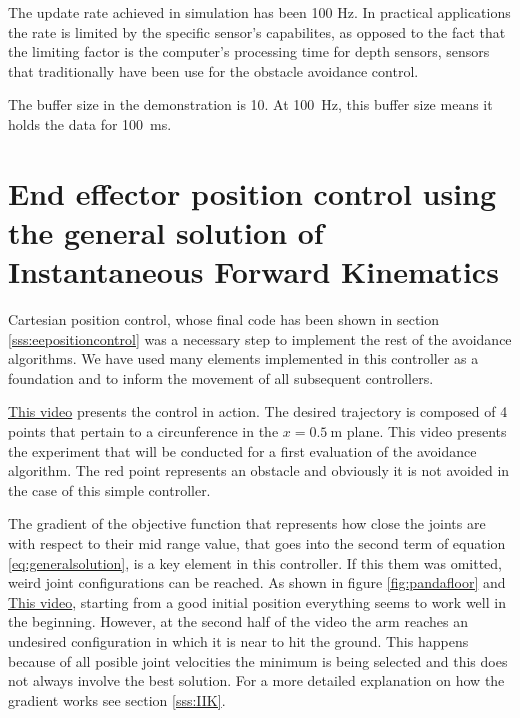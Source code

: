 The update rate achieved in simulation has been 100 Hz. In practical applications the rate is limited by the specific sensor's capabilites, as opposed to the fact that the limiting factor is the computer's processing time for depth sensors, sensors that traditionally have been use for the obstacle avoidance control.

The buffer size in the demonstration is 10. At \SI{100}{\hertz}, this buffer size means it holds the data for \SI{100}{\milli \second}.



\section{End effector position control using the general solution of Instantaneous Forward Kinematics}
\label{s:resultsposition}

Cartesian position control, whose final code has been shown in section \ref{sss:eepositioncontrol} was a necessary step to implement the rest of the avoidance algorithms. We have used many elements implemented in this controller as a foundation and to inform the movement of all subsequent controllers.

\href{https://www.youtube.com/watch?v=o4eRN95Fb8s&list=PLnhdDYfKdsgimnQTQO-bmtKj-KRdbvGgS&index=3&t=0s}{This video} presents the control in action. The desired trajectory is composed of 4 points that pertain to a circunference in the $x = \SI{0.5}{\metre}$ plane. This video presents the experiment that will be conducted for a first evaluation of the avoidance algorithm. The red point represents an obstacle and obviously it is not avoided in the case of this simple controller.

The gradient of the objective function that represents how close the joints are with respect to their mid range value, that goes into the second term of equation \ref{eq:generalsolution}, is a key element in this controller. If this them was omitted, weird joint configurations can be reached. As shown in figure \ref{fig:pandafloor} and \href{https://www.youtube.com/watch?v=JcoRfB1JB88&list=PLnhdDYfKdsgimnQTQO-bmtKj-KRdbvGgS&index=4&t=0s}{This video}, starting from a good initial position everything seems to work well in the beginning. However, at the second half of the video the arm reaches an undesired configuration in which it is near to hit the ground. This happens because of all posible joint velocities the minimum is being selected and this does not always involve the best solution. For a more detailed explanation on how the gradient works see section \ref{sss:IIK}.

